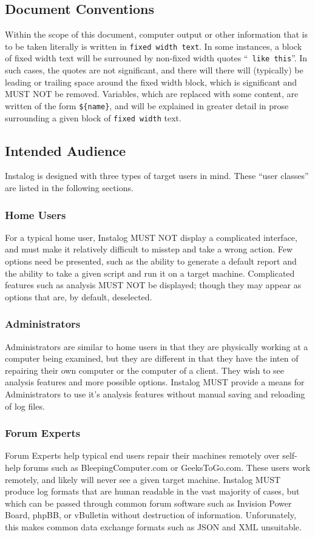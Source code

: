 \documentclass[letterpaper,12pt]{article}
\newcommand{\var}[1]{\texttt{\$\{#1\}}}
\begin{document}
\subsection{Document Conventions}
Within the scope of this document, computer output or other information that is
to be taken literally is written in \texttt{fixed width text}. In some
instances, a block of fixed width text will be surrouned by non-fixed width
quotes ``\texttt{ like this}''. In such cases, the quotes are not significant,
and there will there will (typically) be leading or trailing space around the
fixed width block, which is significant and MUST NOT be removed. Variables,
which are replaced with some content, are written of the form \var{name}, and
will be explained in greater detail in prose surrounding a given block of
\texttt{fixed width} text.

\subsection{Intended Audience}
Instalog is designed with three types of target users in mind. These ``user
classes'' are listed in the following sections.

\subsubsection{Home Users}
For a typical home user, Instalog MUST NOT display a complicated interface, and
must make it relatively difficult to misstep and take a wrong action. Few
options need be presented, such as the ability to generate a default report and
the ability to take a given script and run it on a target machine. Complicated
features such as analysis MUST NOT be displayed; though they may appear as
options that are, by default, deselected.

\subsubsection{Administrators}
Administrators are similar to home users in that they are physically working at
a computer being examined, but they are different in that they have the inten of
repairing their own computer or the computer of a client. They wish to see
analysis features and more possible options. Instalog MUST provide a means for
Administrators to use it's analysis features without manual saving and reloading
of log files.

\subsubsection{Forum Experts}
Forum Experts help typical end users repair their machines remotely over
self-help forums such as BleepingComputer.com or GeeksToGo.com.
These users work remotely, and likely will never see a given target
machine.
Instalog MUST produce log formats that are human readable in the vast majority
of cases, but which can be passed through common forum software such as Invision
Power Board, phpBB, or vBulletin without destruction of information.
Unforunately, this makes common data exchange formats such as JSON and XML
unsuitable. 
\end{document}
